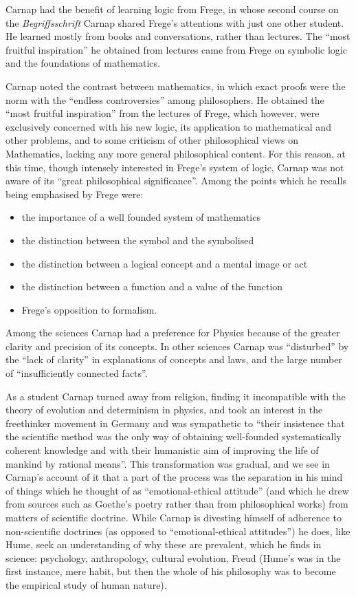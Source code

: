 \documentclass[10pt,titlepage]{book}
\begin{document}
Carnap had the benefit of learning logic from Frege, in whose second course on the {\it Begriffsschrift} Carnap shared Frege's attentions with just one other student.
He learned mostly from books and conversations, rather than lectures.
The ``most fruitful inspiration'' he obtained from lectures came from Frege on symbolic logic and the foundations of mathematics.

Carnap noted the contrast between mathematics, in which exact proofs were the norm with the ``endless controversies'' among philosophers. 
He obtained the ``most fruitful inspiration'' from the lectures of Frege, which however, were exclusively concerned with his new logic, its application to mathematical and other problems, and to some criticism of other philosophical views on Mathematics, lacking any more general philosophical content.
For this reason, at this time, though intensely interested in Frege's system of logic, Carnap was not aware of its ``great philosophical significance''.
Among the points which he recalls being emphasised by Frege were:
\begin{itemize}
\item the importance of a well founded system of mathematics
\item the distinction between the symbol and the symbolised
\item the distinction between a logical concept and a mental image or act
\item the distinction between a function and a value of the function
\item Frege's opposition to formalism.
\end{itemize}

Among the sciences Carnap had a preference for Physics because of the greater clarity and precision of its concepts.
In other sciences Carnap was ``disturbed'' by the ``lack of clarity'' in explanations of concepts and laws, and the large number of ``insufficiently connected facts''.

As a student Carnap turned away from religion, finding it incompatible with the theory of evolution and determinism in physics, and took an interest in the freethinker movement in Germany and was sympathetic to ``their insistence that the scientific method was the only way of obtaining well-founded systematically coherent knowledge and with their humanistic aim of improving the life of mankind by rational means''.
This transformation was gradual, and we see in Carnap's account of it that a part of the process was the separation in his mind of things which he thought of as ``emotional-ethical attitude'' (and which he drew from sources such as Goethe's poetry rather than from philosophical works) from matters of scientific doctrine.
While Carnap is divesting himself of adherence to non-scientific doctrines (as opposed to ``emotional-ethical attitudes'') he does, like Hume, seek an understanding of why these are prevalent, which he finds in science: psychology, anthropology, cultural evolution, Freud (Hume's was in the first instance, mere habit, but then the whole of his philosophy was to become the empirical study of human nature).
\end{document}
